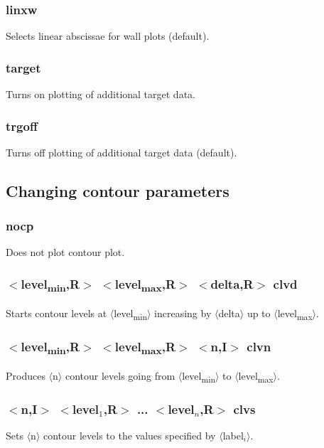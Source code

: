 \documentclass[a4paper,10pt]{report}
\begin{document}
\subsubsection{linxw}\label{sec:linxw}
Selects linear abscissae for wall plots (default).

\subsubsection{target}\label{sec:target}
Turns on plotting of additional target data.

\subsubsection{trgoff}\label{sec:trgoff}
Turns off plotting of additional target data (default).


\subsection{Changing contour parameters}\label{sec:contourparameters}

\subsubsection{nocp}\label{sec:nocp}
Does not plot contour plot.

\subsubsection{$<$level\textsubscript{min},{\bf R}$>$ $<$level\textsubscript{max},{\bf R}$>$ $<$delta,{\bf R}$>$ clvd}\label{sec:clvd}
Starts contour levels at $\langle$level\textsubscript{min}$\rangle$ increasing by $\langle$delta$\rangle$ up
to $\langle$level\textsubscript{max}$\rangle$.

\subsubsection{$<$level\textsubscript{min},{\bf R}$>$ $<$level\textsubscript{max},{\bf R}$>$ $<$n,{\bf I}$>$ clvn}\label{sec:clvn}
Produces $\langle$n$\rangle$ contour levels going from $\langle$level\textsubscript{min}$\rangle$ to $\langle$level\textsubscript{max}$\rangle$.

\subsubsection{$<$n,{\bf I}$>$ $<$level$_1$,{\bf R}$>$ ... $<$level$_n$,{\bf R}$>$ clvs}\label{sec:clvs}
Sets $\langle$n$\rangle$ contour levels to the values specified by $\langle$label$_i$$\rangle$.
\end{document}
